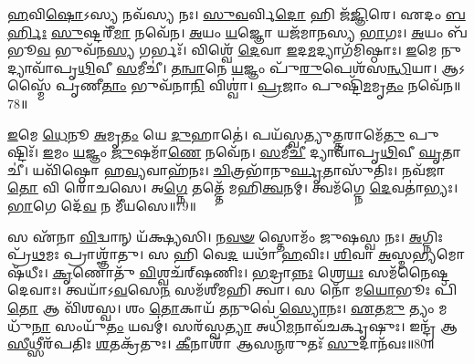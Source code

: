 \-\ul{𑌹}\-𑌵𑌿\-\ul{𑌷𑍋}\-𑌽𑌸𑍍𑌯 𑌨𑌵᳴𑌸𑍍𑌯 𑌨𑌃।
\-\ul{𑌸𑍁}\-\-\ul{𑌵}\-𑌰𑍍𑌵𑌿\-\ul{𑌦𑍋} 𑌹𑌿 𑌜᳴\-\ul{𑌜𑍍𑌞𑌿}\-𑌰𑍇।
𑌏𑌦𑌂 \ul{𑌬}\-\-\ul{𑌰𑍍}\-𑌹𑌿𑌃 \ul{𑌸𑍁}\-𑌷𑍍𑌟𑌰𑍀᳴\-\ul{𑌮𑌾} 𑌨𑌵𑍇᳴𑌨।
\-\ul{𑌅}\-𑌯𑌂 \ul{𑌯}\-𑌜𑍍𑌞𑍋 𑌯𑌜᳴𑌮𑌾𑌨𑌸𑍍𑌯 \ul{𑌭𑌾}\-𑌗𑌃।
\-\ul{𑌅}\-𑌯𑌂 𑌬᳴𑌭𑍂\-\ul{𑌵} 𑌭𑍁𑌵᳴𑌨\-\ul{𑌸𑍍𑌯} 𑌗𑌰𑍍𑌭𑌃᳴।
𑌵𑌿𑌶𑍍𑌵𑍇᳴ \ul{𑌦𑍇}\-𑌵𑌾 \ul{𑌇}\-𑌦\-\ul{𑌮}\-𑌦𑍍𑌯𑌾𑌗᳴𑌮𑌿𑌷𑍍𑌠𑌾𑌃।
\-\ul{𑌇}\-𑌮𑍇 𑌨𑍁 𑌦𑍍𑌯𑌾𑌵𑌾᳴𑌪𑍃\-\ul{𑌥𑌿}\-𑌵𑍀 \ul{𑌸}\-𑌮𑍀𑌚𑍀॑।
\-\ul{𑌤}\-\-\ul{𑌨𑍍𑌵𑌾}\-𑌨𑍇 \ul{𑌯}\-𑌜𑍍𑌞𑌂 𑌪𑍁᳴\-\ul{𑌰𑍁}\-𑌪𑍇𑌶᳴𑌸\-\ul{𑌨𑍍𑌧𑌿}\-𑌯𑌾।
𑌆𑌽𑌸𑍍𑌮𑍈᳴ 𑌪𑍃𑌣𑍀\-\ul{𑌤𑌾𑌂} 𑌭𑍁𑌵᳴𑌨𑌾\-\ul{𑌨𑌿} 𑌵𑌿𑌶𑍍𑌵𑌾॑।
\-\ul{𑌪𑍍𑌰}\-𑌜𑌾𑌂 𑌪𑍁𑌷𑍍𑌟𑌿᳴\-\ul{𑌮}\-𑌮𑍃\-\ul{𑌤𑌂} 𑌨𑌵𑍇᳴𑌨॥78॥

\-\ul{𑌇}\-𑌮𑍇 \ul{𑌧𑍇}\-𑌨𑍂 \ul{𑌅}\-𑌮𑍃\-\ul{𑌤𑌂} 𑌯𑍇 \ul{𑌦𑍁}\-𑌹𑌾𑌤𑍇॑।
𑌪𑌯᳴𑌸𑍍𑌵𑌤𑍍𑌯𑍁\-\ul{𑌤𑍍𑌤}\-𑌰𑌾𑌮𑍇᳴\-\ul{𑌤𑍁} 𑌪𑍁𑌷𑍍𑌟𑌿𑌃᳴।
\-\ul{𑌇}\-𑌮𑌂 \ul{𑌯}\-𑌜𑍍𑌞𑌂 \ul{𑌜𑍁}\-𑌷𑌮𑌾᳴\-\ul{𑌣𑍇} 𑌨𑌵𑍇᳴𑌨।
\-\ul{𑌸}\-𑌮𑍀\-\ul{𑌚𑍀} 𑌦𑍍𑌯𑌾𑌵𑌾᳴𑌪𑍃\-\ul{𑌥𑌿}\-𑌵𑍀 \ul{𑌘𑍃}\-𑌤𑌾𑌚𑍀॑।
𑌯𑌵𑌿᳴𑌷𑍍𑌠𑍋 𑌹\-\ul{𑌵𑍍𑌯}\-𑌵𑌾𑌹᳴𑌨𑌃।
\-\ul{𑌚𑌿}\-𑌤𑍍𑌰𑌭𑌾᳴𑌨𑍁\-\ul{𑌰𑍍𑌘𑍃}\-𑌤𑌾𑌸𑍁᳴𑌤𑌿𑌃।
𑌨𑌵᳴𑌜𑌾\-\ul{𑌤𑍋} 𑌵𑌿 𑌰𑍋᳴𑌚𑌸𑍇।
𑌅\-\ul{𑌗𑍍𑌨𑍇} 𑌤𑌤𑍍𑌤𑍇᳴ 𑌮𑌹𑌿\-\ul{𑌤𑍍𑌵}\-𑌨𑌮𑍍।
𑌤𑍍𑌵𑌮᳴𑌗𑍍𑌨𑍇 \ul{𑌦𑍇}\-𑌵𑌤𑌾॑𑌭𑍍𑌯𑌃।
\-\ul{𑌭𑌾}\-𑌗𑍇 𑌦𑍇᳴\-\ul{𑌵} 𑌨 𑌮𑍀᳴𑌯𑌸𑍇॥79॥

𑌸 𑌏᳴𑌨𑌾 \ul{𑌵𑌿}\-𑌦𑍍𑌵𑌾𑌨𑍍 𑌯᳴𑌕𑍍𑌷𑍍𑌯𑌸𑌿।
𑌨\-\ul{𑌵}\-\-\ul{𑍟} 𑌸𑍍𑌤𑍋𑌮𑌂᳴ 𑌜𑍁𑌷𑌸𑍍𑌵 𑌨𑌃।
\-\ul{𑌅}\-𑌗𑍍𑌨𑌿𑌃 𑌪𑍍𑌰᳴\-\ul{𑌥}\-𑌮𑌃 𑌪𑍍𑌰𑌾𑌶𑍍𑌞𑌾᳴𑌤𑍁।
𑌸 𑌹𑌿 𑌵𑍇\-\ul{𑌦} 𑌯𑌥𑌾᳴ \ul{𑌹}\-𑌵𑌿𑌃।
\-\ul{𑌶𑌿}\-𑌵𑌾 \ul{𑌅}\-𑌸𑍍𑌮\-\ul{𑌭𑍍𑌯}\-𑌮𑍋𑌷᳴𑌧𑍀𑌃।
\-\ul{𑌕𑍃}\-𑌣𑍋𑌤𑍁᳴ \ul{𑌵𑌿}\-𑌶𑍍𑌵𑌚᳴𑌰𑍍‌\mbox{}𑌷𑌣𑌿𑌃।
\-\ul{𑌭}\-𑌦𑍍𑌰𑌾\-\ul{𑌨𑍍𑌨𑌃} 𑌶𑍍𑌰𑍇\-\ul{𑌯𑌃} 𑌸𑌮᳴𑌨𑍈𑌷𑍍𑌟 𑌦𑍇𑌵𑌾𑌃।
𑌤𑍍𑌵𑌯𑌾᳴\-𑌽\-\ul{𑌵}\-𑌸𑍇\-\ul{𑌨} 𑌸𑌮᳴𑌶𑍀𑌮𑌹𑌿 𑌤𑍍𑌵𑌾।
𑌸 𑌨𑍋᳴ 𑌮\-\ul{𑌯𑍋}\-𑌭𑍂𑌃 𑌪𑌿᳴\-\ul{𑌤𑍋} 𑌆 𑌵𑌿᳴𑌶𑌸𑍍𑌵।
𑌶𑌂 \ul{𑌤𑍋}\-𑌕𑌾𑌯᳴ \ul{𑌤}\-𑌨𑍁𑌵𑍇॑ \ul{𑌸𑍍𑌯𑍋}\-𑌨𑌃।
\-\ul{𑌏}\-𑌤\-\ul{𑌮𑍁} 𑌤𑍍𑌯𑌂 𑌮𑌧𑍁᳴\-\ul{𑌨𑌾} 𑌸𑌂𑌯𑍁᳴\-\ul{𑌤𑌂} 𑌯𑌵𑌮𑍍॑।
𑌸𑌰᳴𑌸𑍍𑌵\-\ul{𑌤𑍍𑌯𑌾} 𑌅𑌧𑌿᳴\-\ul{𑌮}\-𑌨𑌾𑌵᳴𑌚𑌰𑍍𑌕𑍃𑌷𑍁𑌃।
𑌇𑌨𑍍𑌦𑍍𑌰᳴ 𑌆\-\ul{𑌸𑍀}\-𑌥𑍍𑌸𑍀𑌰᳴𑌪𑌤𑌿𑌃 \ul{𑌶}\-𑌤𑌕𑍍𑌰᳴𑌤𑍁𑌃।
\-\ul{𑌕𑍀}\-𑌨𑌾𑌶𑌾᳴ 𑌆𑌸\-\ul{𑌨𑍍𑌮}\-𑌰𑍁𑌤𑌃᳴ \ul{𑌸𑍁}\-𑌦𑌾𑌨᳴𑌵𑌃॥80॥\anuvakamend[\-\ul{𑌪𑍁}\-\-\ul{𑌰}\-\-\ul{𑌏}\-𑌤𑌾 𑌵𑍃᳴𑌣𑍀𑌮𑌹𑍇 \ul{𑌜𑍁}\-𑌷𑍇𑌥𑌾॑𑌨𑍍𑌤𑌰𑍍𑌪𑌯\-\ul{𑌤𑌾}\-𑌮𑍃\-\ul{𑌤}\-𑌨𑍍𑌨𑌵𑍇᳴𑌨 𑌮𑍀𑌯𑌸𑍇 \ul{𑌸𑍍𑌯𑍋}\-𑌨\-\ul{𑌶𑍍𑌚}\-𑌤𑍍𑌵𑌾𑌰𑌿᳴ 𑌚]




\clearpage
{}
\setcounter{anuvakam}{0}

